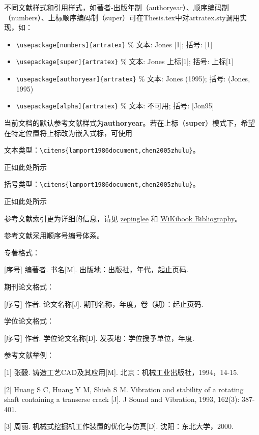 不同文献样式和引用样式，如著者-出版年制（authoryear）、顺序编码制（numbers）、上标顺序编码制（super）可在Thesis.tex中对artratex.sty调用实现，如：
\begin{itemize}
    \footnotesize
    \item \verb+\usepackage[numbers]{artratex}+ $\%$ 文本: Jones [1]; 括号: [1]
    \item \verb+\usepackage[super]{artratex}+ $\%$ 文本: Jones 上标[1]; 括号: 上标[1]
    \item \verb+\usepackage[authoryear]{artratex}+ $\%$ 文本: Jones (1995); 括号: (Jones, 1995)
    \item \verb+\usepackage[alpha]{artratex}+ $\%$ 文本: 不可用; 括号: [Jon95]
\end{itemize}

当前文档的默认参考文献样式为\textbf{authoryear}。若在上标（\textbf{super}）模式下，希望在特定位置将上标改为嵌入式标，可使用

文本类型：\verb|\citens{lamport1986document,chen2005zhulu}|。

正如此处所示\cite{lamport1986document,chen2005zhulu}

括号类型：\verb|\citens{lamport1986document,chen2005zhulu}|。

正如此处所示\cite{lamport1986document,chen2005zhulu}

参考文献索引更为详细的信息，请见 \href{https://github.com/zepinglee/gbt7714-bibtex-style}{zepinglee} 和 \href{https://en.wikibooks.org/wiki/LaTeX/Bibliography_Management}{WiKibook Bibliography}。


参考文献采用顺序号编号体系。

专著格式： 

[序号] 编著者. 书名[M]. 出版地：出版社，年代，起止页码.

期刊论文格式： 

[序号] 作者. 论文名称[J]. 期刊名称，年度，卷（期）：起止页码.

学位论文格式： 

[序号] 作者. 学位论文名称[D]. 发表地：学位授予单位，年度.

参考文献举例： 

[1] 张毅. 铸造工艺CAD及其应用[M]. 北京：机械工业出版社，1994，14-15. 

[2] Huang S C, Huang Y M, Shieh S M. Vibration and stability of a rotating shaft containing a transerse crack [J]. J Sound and Vibration, 1993, 162(3): 387-401.

[3] 周丽. 机械式挖掘机工作装置的优化与仿真[D]. 沈阳：东北大学，2000.


